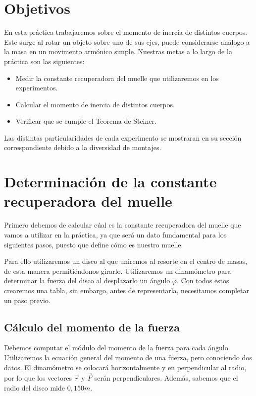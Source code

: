 \documentclass[12pt, a4paper, titlepage]{article}
\begin{document}
  \section{Objetivos}

  En esta práctica trabajaremos sobre el momento de inercia de distintos cuerpos. Este surge al rotar un objeto sobre uno de sus ejes, puede considerarse análogo a la masa en un movimento armónico simple. Nuestras metas a lo largo de la práctica son las siguientes:
  \begin{itemize}[label=$-$]
    \item Medir la constante recuperadora del muelle que utilizaremos en los experimentos.
    \item Calcular el momento de inercia de distintos cuerpos.
    \item Verificar que se cumple el Teorema de Steiner.
  \end{itemize}
  Las distintas particularidades de cada experimento se mostraran en su sección correspondiente debido a la diversidad de montajes.

  \section{Determinación de la constante recuperadora del muelle}

  Primero debemos de calcular cúal es la constante recuperadora del muelle que vamos a utilizar en la práctica, ya que será un dato fundamental para los siguientes pasos, puesto que define cómo es nuestro muelle.

  Para ello utilizaremos un disco al que uniremos al resorte en el centro de masas, de esta manera permitiéndonos girarlo. Utilizaremos un dinamómetro para determinar la fuerza del disco al desplazarlo un ángulo $\varphi$. Con todos estos crearemos una tabla, sin embargo, antes de representarla, necesitamos completar un paso previo.

  \subsection{Cálculo del momento de la fuerza}

  Debemos computar el módulo del momento de la fuerza para cada ángulo. Utilizaremos la ecuación general del momento de una fuerza, pero conociendo dos datos. El dinamómetro se colocará horizontalmente y en perpendicular al radio, por lo que los vectores $\vec{r}$ y $\vec{F}$ serán perpendiculares. Además, sabemos que el radio del disco mide $0,150m$.
\end{document}
